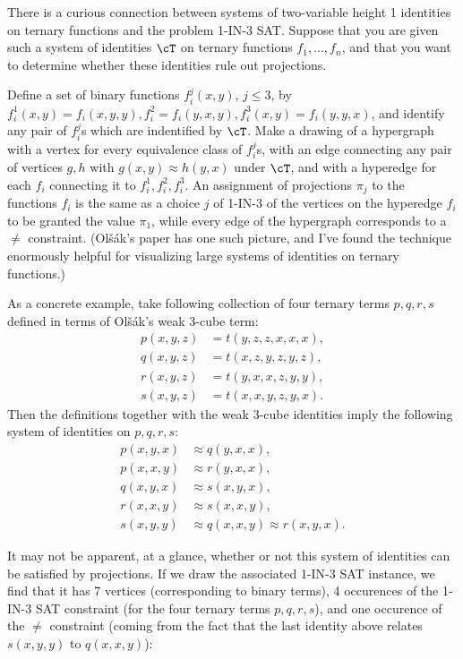 \begin{rem} There is a curious connection between systems of two-variable height 1 identities on ternary functions and the problem 1-IN-3 SAT. Suppose that you are given such a system of identities $\cT$ on ternary functions $f_1, ..., f_n$, and that you want to determine whether these identities rule out projections.

Define a set of binary functions $f_i^j(x,y)$, $j \le 3$, by $f_i^1(x,y) = f_i(x,y,y), f_i^2 = f_i(y,x,y), f_i^3(x,y) = f_i(y,y,x)$, and identify any pair of $f_i^j$s which are indentified by $\cT$. Make a drawing of a hypergraph with a vertex for every equivalence class of $f_i^j$s, with an edge connecting any pair of vertices $g,h$ with $g(x,y) \approx h(y,x)$ under $\cT$, and with a hyperedge for each $f_i$ connecting it to $f_i^1, f_i^2, f_i^3$. An assignment of projections $\pi_j$ to the functions $f_i$ is the same as a choice $j$ of 1-IN-3 of the vertices on the hyperedge $f_i$ to be granted the value $\pi_1$, while every edge of the hypergraph corresponds to a $\ne$ constraint. (Ol{\v{s}}{\'a}k's paper \cite{olsak-weak} has one such picture, and I've found the technique enormously helpful for visualizing large systems of identities on ternary functions.)

As a concrete example, take following collection of four ternary terms $p,q,r,s$ defined in terms of Ol\v{s}\'ak's weak 3-cube term:
\begin{align*}
p(x,y,z) &= t(y,z,z,x,x,x),\\
q(x,y,z) &= t(x,z,y,z,y,z),\\
r(x,y,z) &= t(y,x,x,z,y,y),\\
s(x,y,z) &= t(x,x,y,z,y,x).
\end{align*}
Then the definitions together with the weak 3-cube identities imply the following system of identities on $p,q,r,s$:
\begin{align*}
p(x,y,x) &\approx q(y,x,x),\\
p(x,x,y) &\approx r(y,x,x),\\
q(x,y,x) &\approx s(x,y,x),\\
r(x,x,y) &\approx s(x,x,y),\\
s(x,y,y) &\approx q(x,x,y) \approx r(x,y,x). 
\end{align*}

It may not be apparent, at a glance, whether or not this system of identities can be satisfied by projections. If we draw the associated 1-IN-3 SAT instance, we find that it has 7 vertices (corresponding to binary terms), 4 occurences of the 1-IN-3 SAT constraint (for the four ternary terms $p,q,r,s$), and one occurence of the $\ne$ constraint (coming from the fact that the last identity above relates $s(x,y,y)$ to $q(x,x,y)$):
\begin{center}
\end{center}
\end{rem}
